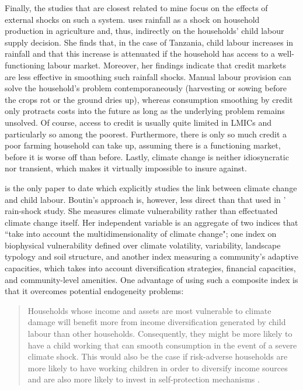 \documentclass[a4paper,12pt]{article}
\theoremstyle{plain}
\theoremstyle{definition}
\theoremstyle{definition}
\theoremstyle{definition}
\theoremstyle{definition}
\begin{document}
Finally, the studies that are closest related to mine focus on the effects of external shocks on such a system. \citet{Dumas2015,Dumas2020} uses rainfall as a shock on household production in agriculture and, thus, indirectly on the households' child labour supply decision. She finds that, in the case of Tanzania, child labour increases in rainfall and that this increase is attenuated if the household has access to a well-functioning labour market. Moreover, her findings indicate that credit markets are less effective in smoothing such rainfall shocks. Manual labour provision can solve the household's problem contemporaneously (harvesting or sowing before the crops rot or the ground dries up), whereas consumption smoothing by credit only protracts costs into the future as long as the underlying problem remains unsolved. Of course, access to credit is usually quite limited in LMICs and particularly so among the poorest. Furthermore, there is only so much credit a poor farming household can take up, assuming there is a functioning market, before it is worse off than before. Lastly, climate change is neither idiosyncratic nor transient, which makes it virtually impossible to insure against.  

\citet{Boutin2014} is the only paper to date which explicitly studies the link between climate change and child labour. Boutin's approach is, however, less direct than that used in \citeauthor{Dumas2020}' rain-shock study. She measures climate vulnerability rather than effectuated climate change itself. Her independent variable is an aggregate of two indices that ``take into account the multidimensionality of climate change"\citep[][p. 5]{Boutin2014}; one index on biophysical vulnerability defined over climate volatility, variability, landscape typology and soil structure, and another index measuring a community's adaptive capacities, which takes into account diversification strategies, financial capacities, and community-level amenities. One advantage of using such a composite index is that it overcomes potential endogeneity problems:

\begin{quote}
Households whose income and assets are most vulnerable to climate damage will benefit more from income diversification generated by child labour than other households. Consequently, they might be more likely to have a child working that can smooth consumption in the event of a severe climate shock. This would also be the case if risk-adverse households are more likely to have working children in order to diversify income sources and are also more likely to invest in self-protection mechanisms \citep[][p.5]{Boutin2014}.
\end{quote}
\end{document}
